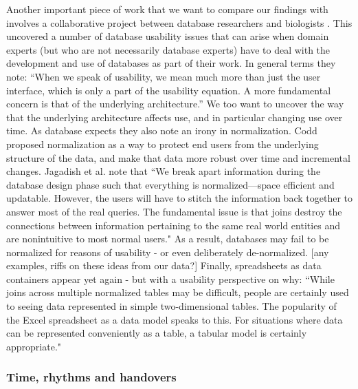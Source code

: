 Another important piece of work that we want to compare our findings with involves a collaborative project between database researchers and biologists   \cite{jagadish2007making}. This uncovered a number of database usability issues that can arise when domain experts (but who are not necessarily database experts) have to deal with the development and use of databases as part of their work. In general terms they note: “When we speak of usability, we mean much more than just the user interface, which is only a part of the usability equation. A more fundamental concern is that of the underlying architecture.” We too want to uncover the way that the underlying architecture affects use, and in particular changing use over time. As database expects they also note an irony in normalization. Codd proposed normalization as a way to protect end users from the underlying structure of the data, and make that data more robust over time and incremental changes. Jagadish et al. note that “We break apart information during the database design phase such that everything is normalized—space efficient and updatable. However, the users will have to stitch the information back together to answer most of the real queries. The fundamental issue is that joins destroy the connections between information pertaining to the same real world entities and are nonintuitive to most normal users." As a result, databases may fail to be normalized for reasons of usability - or even deliberately de-normalized. [any examples, riffs on these ideas from our data?] Finally, spreadsheets as data containers appear yet again - but with a usability perspective on why: “While joins across multiple normalized tables may be difficult, people are certainly used to seeing data represented in simple two-dimensional tables. The popularity of the Excel spreadsheet as a data model speaks to this. For situations where data can be represented conveniently as a table, a tabular model is certainly appropriate."

\subsubsection{Time, rhythms and handovers}

